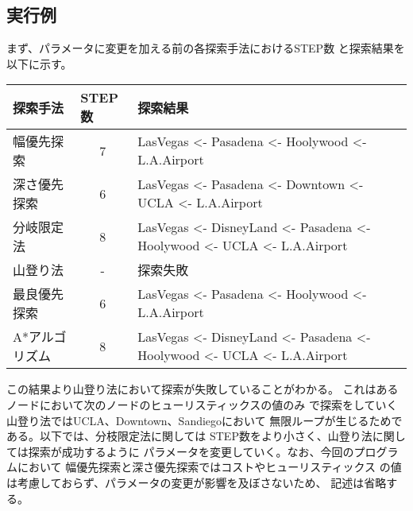 \documentclass{jarticle}
\begin{document}
\subsection{実行例}

まず、パラメータに変更を加える前の各探索手法におけるSTEP数
と探索結果を以下に示す。
\begin{table}[h]
  \begin{tabular}{|l|c|l|}
    \hline
    探索手法       & \multicolumn{1}{l|}{STEP数} & 探索結果                                                                                                                 \\ \hline
    幅優先探索     & 7                           & LasVegas \textless{}- Pasadena \textless{}- Hoolywood \textless{}- L.A.Airport                                           \\ \hline
    深さ優先探索   & 6                           & LasVegas \textless{}- Pasadena \textless{}- Downtown \textless{}- UCLA \textless{}- L.A.Airport                          \\ \hline
    分岐限定法     & 8                           & LasVegas \textless{}- DisneyLand \textless{}- Pasadena \textless{}- Hoolywood \textless{}- UCLA \textless{}- L.A.Airport \\ \hline
    山登り法       & -                           & 探索失敗                                                                                                                 \\ \hline
    最良優先探索   & 6                           & LasVegas \textless{}- Pasadena \textless{}- Hoolywood \textless{}- L.A.Airport                                           \\ \hline
    A*アルゴリズム & 8                           & LasVegas \textless{}- DisneyLand \textless{}- Pasadena \textless{}- Hoolywood \textless{}- UCLA \textless{}- L.A.Airport \\ \hline
  \end{tabular}
\end{table}

この結果より山登り法において探索が失敗していることがわかる。
これはあるノードにおいて次のノードのヒューリスティックスの値のみ
で探索をしていく山登り法ではUCLA、Downtown、Sandiegoにおいて
無限ループが生じるためである。以下では、分枝限定法に関しては
STEP数をより小さく、山登り法に関しては探索が成功するように
パラメータを変更していく。なお、今回のプログラムにおいて
幅優先探索と深さ優先探索ではコストやヒューリスティックス
の値は考慮しておらず、パラメータの変更が影響を及ぼさないため、
記述は省略する。
\end{document}
